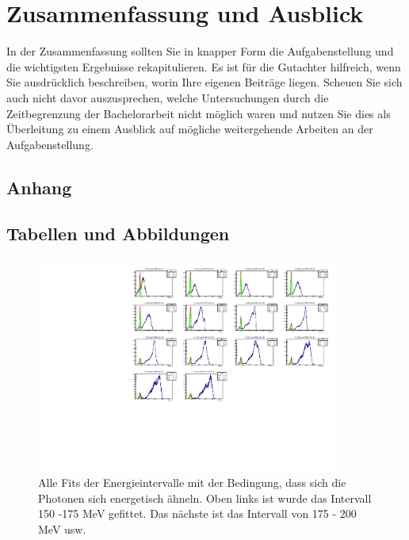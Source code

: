 \documentclass[a4paper,11pt,oneside,final,german,openbib,pdftex]{scrbook}
\begin{document}
{%
\chapter{Zusammenfassung und Ausblick}

In der Zusammenfassung sollten Sie in knapper Form die Aufgabenstellung 
und die wichtigsten Ergebnisse rekapitulieren. Es ist f\"ur die 
Gutachter hilfreich, wenn Sie ausdr\"ucklich beschreiben, worin 
Ihre eigenen Beitr\"age liegen. Scheuen Sie sich auch nicht davor 
auszusprechen, welche Untersuchungen durch die Zeitbegrenzung der 
Bachelorarbeit nicht m\"oglich waren und nutzen Sie dies als 
\"Uberleitung zu einem Ausblick auf m\"ogliche weitergehende 
Arbeiten an der Aufgabenstellung.

\begin{appendix}
\chapter{Anhang}

\section{Tabellen und Abbildungen}


\begin{figure}[h]
	\begin{center}
		\includegraphics[width=100mm]{allfitsenergyintervallwithCondition1303}
		\caption{Alle Fits der Energieintervalle mit der Bedingung, dass sich die Photonen sich energetisch ähneln. Oben links ist wurde das Intervall 150 -175 MeV gefittet. Das nächste ist das Intervall von 175 - 200 MeV usw.}
		\label{fig:similarenergyallfits}
	\end{center}
\end{figure}





\end{appendix}}
\end{document}
